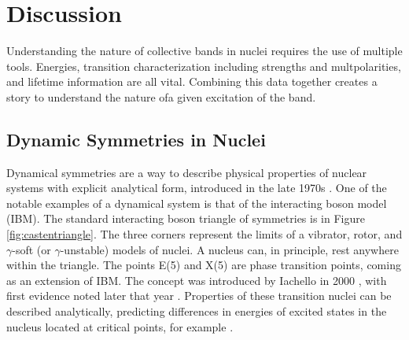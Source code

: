 %
%
%
%
%
%
%
%
%
%


%
%

\chapter{Discussion}

Understanding the nature of collective bands in nuclei requires the use of multiple tools. Energies, transition characterization including strengths and multpolarities, and lifetime information are all vital. Combining this data together creates a story to understand the nature ofa given excitation of the band.

\section{Dynamic Symmetries in Nuclei}

Dynamical symmetries are a way to describe physical properties of nuclear systems with explicit analytical form, introduced in the late 1970s \citep{vanisacker99:_symmetries}. One of the notable examples of a dynamical system is that of the interacting boson model (IBM). The standard interacting boson triangle of symmetries is in Figure \ref{fig:castentriangle}. The three corners represent the limits of a vibrator, rotor, and $\gamma$-soft (or $\gamma$-unstable) models of nuclei. A nucleus can, in principle, rest anywhere within the triangle. The points E(5) and X(5) are phase transition points, coming as an extension of IBM. The concept was introduced by Iachello in 2000 \citep{iachello00:_x5}, with first evidence noted later that year \citep{casten00:_x5}. Properties of these transition nuclei can be described analytically, predicting differences in energies of excited states in the nucleus located at critical points, for example \citep{iachello01:_x5}.

